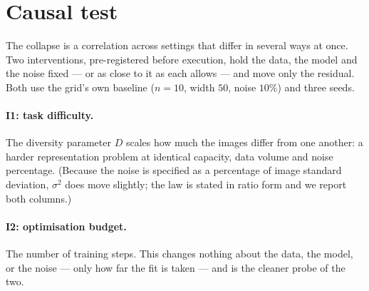 \documentclass[10pt]{article}
\begin{document}
\section{Causal test}
\label{sec:causal}

The collapse is a correlation across settings that differ in several ways at once. Two
interventions, pre-registered before execution, hold the data, the model and the noise fixed
--- or as close to it as each allows --- and move only the residual. Both use the grid's own
baseline ($n=10$, width $50$, noise $10\%$) and three seeds.

\paragraph{I1: task difficulty.} The diversity parameter $D$ scales how much the images differ
from one another: a harder representation problem at identical capacity, data volume and noise
percentage. (Because the noise is specified as a percentage of image standard deviation,
$\sigma^2$ does move slightly; the law is stated in ratio form and we report both columns.)

\paragraph{I2: optimisation budget.} The number of training steps. This changes nothing about
the data, the model, or the noise --- only how far the fit is taken --- and is the cleaner
probe of the two.
\end{document}
